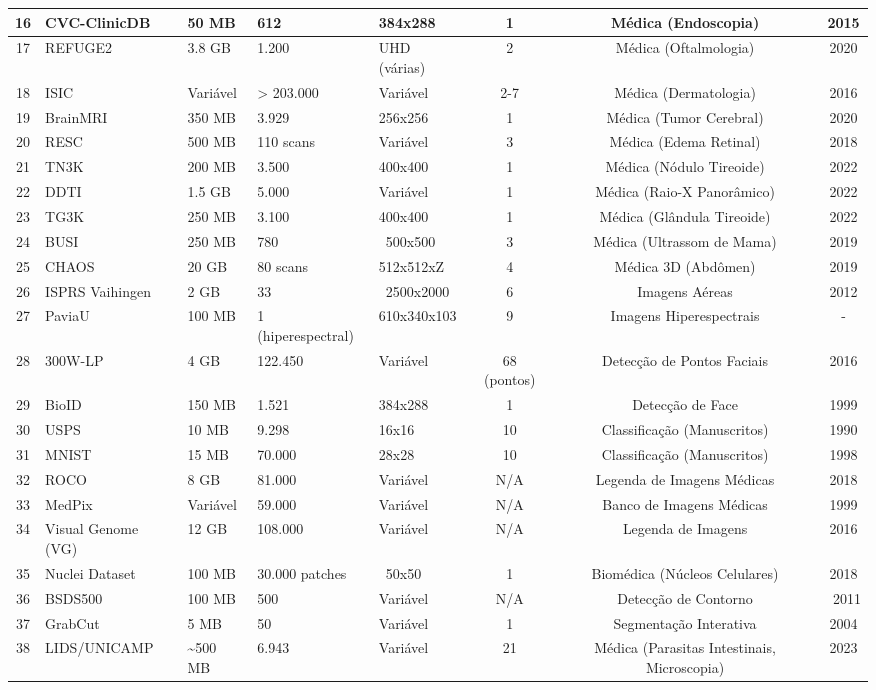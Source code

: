 \begin{table}[h!]
\begin{adjustbox}{angle=90}
\begin{tabular}{|c|l|l|l|l|c|c|c|}
16 & CVC-ClinicDB & 50 MB & 612 & 384x288 & 1 & Médica (Endoscopia) & 2015 \\ \hline
17 & REFUGE2 & 3.8 GB & 1.200 & UHD (várias) & 2 & Médica (Oftalmologia) & 2020 \\ \hline
18 & ISIC & Variável & > 203.000 & Variável & 2-7 & Médica (Dermatologia) & 2016 \\ \hline
19 & BrainMRI & 350 MB & 3.929 & 256x256 & 1 & Médica (Tumor Cerebral) & 2020 \\ \hline
20 & RESC & 500 MB & 110 scans & Variável & 3 & Médica (Edema Retinal) & 2018 \\ \hline
21 & TN3K & 200 MB & 3.500 & 400x400 & 1 & Médica (Nódulo Tireoide) & 2022 \\ \hline
22 & DDTI & 1.5 GB & 5.000 & Variável & 1 & Médica (Raio-X Panorâmico) & 2022 \\ \hline
23 & TG3K & 250 MB & 3.100 & 400x400 & 1 & Médica (Glândula Tireoide) & 2022 \\ \hline
24 & BUSI & 250 MB & 780 & ~500x500 & 3 & Médica (Ultrassom de Mama) & 2019 \\ \hline
25 & CHAOS & 20 GB & 80 scans & 512x512xZ & 4 & Médica 3D (Abdômen) & 2019 \\ \hline
26 & ISPRS Vaihingen & 2 GB & 33 & ~2500x2000 & 6 & Imagens Aéreas & 2012 \\ \hline
27 & PaviaU & 100 MB & 1 (hiperespectral) & 610x340x103 & 9 & Imagens Hiperespectrais & - \\ \hline
28 & 300W-LP & 4 GB & 122.450 & Variável & 68 (pontos) & Detecção de Pontos Faciais & 2016 \\ \hline
29 & BioID & 150 MB & 1.521 & 384x288 & 1 & Detecção de Face & 1999 \\ \hline
30 & USPS & 10 MB & 9.298 & 16x16 & 10 & Classificação (Manuscritos) & 1990 \\ \hline
31 & MNIST & 15 MB & 70.000 & 28x28 & 10 & Classificação (Manuscritos) & 1998 \\ \hline
32 & ROCO & 8 GB & 81.000 & Variável & N/A & Legenda de Imagens Médicas & 2018 \\ \hline
33 & MedPix & Variável & 59.000 & Variável & N/A & Banco de Imagens Médicas & 1999 \\ \hline
34 & Visual Genome (VG) & 12 GB & 108.000 & Variável & N/A & Legenda de Imagens & 2016 \\ \hline
35 & Nuclei Dataset & 100 MB & 30.000 patches & ~50x50 & 1 & Biomédica (Núcleos Celulares) & 2018 \\ \hline
36 & BSDS500 & 100 MB & 500 & Variável & N/A & Detecção de Contorno & ~2011 \\ \hline
37 & GrabCut & 5 MB & 50 & Variável & 1 & Segmentação Interativa & 2004 \\ \hline
38 & LIDS/UNICAMP & \textasciitilde 500 MB & 6.943 & Variável & 21 & Médica (Parasitas Intestinais, Microscopia) & 2023 \\ \hline


\end{tabular}
\end{adjustbox}
\end{table}


